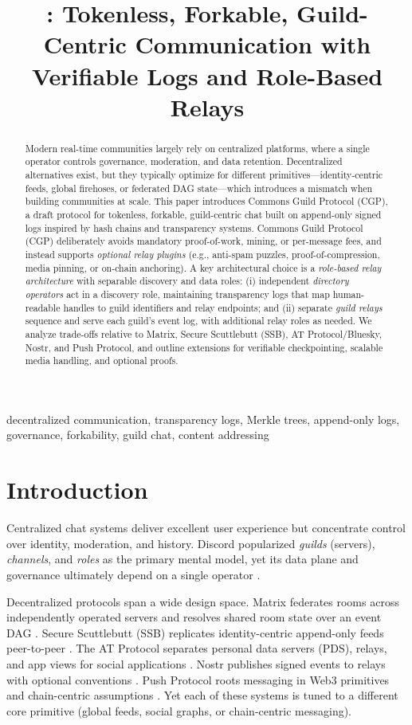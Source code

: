 \documentclass[conference]{IEEEtran}
\title{\cgp: Tokenless, Forkable, Guild-Centric Communication with\\
Verifiable Logs and Role-Based Relays}
\author{%
\IEEEauthorblockN{Ryan Hardesty Lewis}%
\IEEEauthorblockA{Institute for Data, Systems, \& Society, MIT}%
}
\newcommand{\cgp}{Commons Guild Protocol (CGP)\xspace}
\newcommand{\atproto}{AT Protocol\xspace}
\newcommand{\ssb}{Secure Scuttlebutt (SSB)\xspace}
\begin{document}
\maketitle

\begin{abstract}
Modern real-time communities largely rely on centralized platforms, where a single operator controls governance, moderation, and data retention. Decentralized alternatives exist, but they typically optimize for different primitives---identity-centric feeds, global firehoses, or federated DAG state---which introduces a mismatch when building communities at scale. This paper introduces \cgp, a draft protocol for tokenless, forkable, guild-centric chat built on append-only signed logs inspired by hash chains and transparency systems. \cgp deliberately avoids mandatory proof-of-work, mining, or per-message fees, and instead supports \emph{optional relay plugins} (e.g., anti-spam puzzles, proof-of-compression, media pinning, or on-chain anchoring). A key architectural choice is a \emph{role-based relay architecture} with separable discovery and data roles: (i) independent \emph{directory operators} act in a discovery role, maintaining transparency logs that map human-readable handles to guild identifiers and relay endpoints; and (ii) separate \emph{guild relays} sequence and serve each guild's event log, with additional relay roles as needed. We analyze trade-offs relative to Matrix, \ssb, \atproto/Bluesky, Nostr, and Push Protocol, and outline extensions for verifiable checkpointing, scalable media handling, and optional proofs.
\end{abstract}

\begin{IEEEkeywords}
decentralized communication, transparency logs, Merkle trees, append-only logs, governance, forkability, guild chat, content addressing
\end{IEEEkeywords}

\section{Introduction}
Centralized chat systems deliver excellent user experience but concentrate control over identity, moderation, and history. Discord popularized \emph{guilds} (servers), \emph{channels}, and \emph{roles} as the primary mental model, yet its data plane and governance ultimately depend on a single operator \cite{discordGuild}. 

Decentralized protocols span a wide design space. Matrix federates rooms across independently operated servers and resolves shared room state over an event DAG \cite{jacob2020matrixdecomposition}. \ssb replicates identity-centric append-only feeds peer-to-peer \cite{tarr2019ssb}. The \atproto separates personal data servers (PDS), relays, and app views for social applications \cite{kleppmann2024atproto}. Nostr publishes signed events to relays with optional conventions \cite{wei2024nostr}. Push Protocol roots messaging in Web3 primitives and chain-centric assumptions \cite{pushLitepaper}. Yet each of these systems is tuned to a different core primitive (global feeds, social graphs, or chain-centric messaging).
\end{document}
